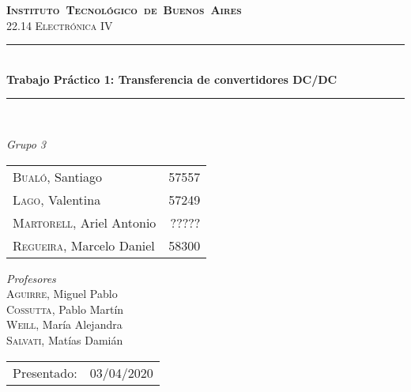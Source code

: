 \begin{titlepage}
\newcommand{\HRule}{\rule{\linewidth}{0.5mm}}
\center
\mbox{\textsc{\LARGE \bfseries {Instituto Tecnol\'ogico de Buenos Aires}}}\\[1.5cm]
\textsc{\Large 22.14 Electrónica IV}\\[0.5cm]


\HRule \\[0.6cm]
{ \Huge \bfseries Trabajo Pr\'actico 1: Transferencia de convertidores DC/DC}\\[0.4cm] %
\HRule \\[1.5cm]


{\large

\emph{Grupo 3}\\
\vspace{3px}

\begin{tabular}{lr} 	
\textsc{Bualó}, Santiago  & 57557 \\
\textsc{Lago}, Valentina  & 57249 \\
\textsc{Martorell}, Ariel Antonio & ????? \\
\textsc{Regueira}, Marcelo Daniel  & 58300 \\
\end{tabular}

\vspace{20px}

\emph{Profesores}\\
\vspace{3px}
\textsc{Aguirre}, Miguel Pablo\\ 	
\textsc{Cossutta}, Pablo Martín\\ 	
\textsc{Weill}, María Alejandra\\ 	
\textsc{Salvati}, Matías Damián\\ 	

\vspace{100px}

\begin{tabular}{ll}

Presentado: & 03/04/2020\\

\end{tabular}

}

\vfill

\end{titlepage}
